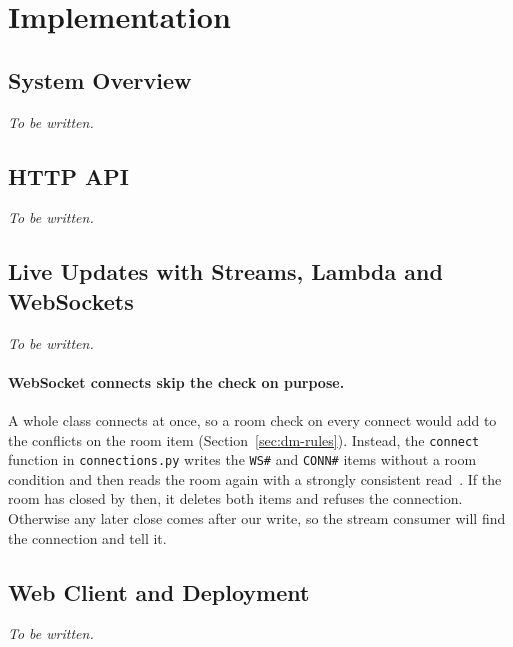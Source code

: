
\section{Implementation}\label{sec:implementation}

\subsection{System Overview}

\textit{To be written.}

\subsection{HTTP API}

\textit{To be written.}

\subsection{Live Updates with Streams, Lambda and WebSockets}\label{sec:impl-live}

\textit{To be written.}

\paragraph{WebSocket connects skip the check on purpose.} A whole class connects at once, so a
room check on every connect would add to the conflicts on the room item
(Section~\ref{sec:dm-rules}). Instead, the \texttt{connect} function in
\texttt{connections.py} writes the \texttt{WS\#} and \texttt{CONN\#} items without a room
condition and then reads the room again with a strongly consistent read~\cite{read-consistency}.
If the room has closed by then, it deletes both items and refuses the connection. Otherwise any
later close comes after our write, so the stream consumer will find the connection and tell it.

\subsection{Web Client and Deployment}

\textit{To be written.}
